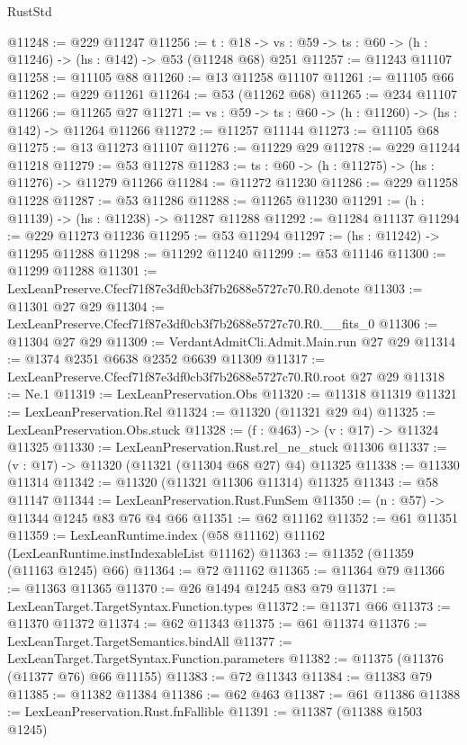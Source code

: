 \begin{lexlean}{RustStd}
\begin{coremodule}
@11248 := @229 @11247
@11256 := {t : @18} ->
  {vs : @59} -> {ts : @60} -> (h : @11246) -> (hs : @142) -> @53 (@11248 @68) @251
@11257 := @11243 @11107
@11258 := @11105 @88
@11260 := @13 @11258 @11107
@11261 := @11105 @66
@11262 := @229 @11261
@11264 := @53 (@11262 @68)
@11265 := @234 @11107
@11266 := @11265 @27
@11271 := {vs : @59} -> {ts : @60} -> (h : @11260) -> (hs : @142) -> @11264 @11266
@11272 := @11257 @11144
@11273 := @11105 @68
@11275 := @13 @11273 @11107
@11276 := @11229 @29
@11278 := @229 @11244 @11218
@11279 := @53 @11278
@11283 := {ts : @60} -> (h : @11275) -> (hs : @11276) -> @11279 @11266
@11284 := @11272 @11230
@11286 := @229 @11258 @11228
@11287 := @53 @11286
@11288 := @11265 @11230
@11291 := (h : @11139) -> (hs : @11238) -> @11287 @11288
@11292 := @11284 @11137
@11294 := @229 @11273 @11236
@11295 := @53 @11294
@11297 := (hs : @11242) -> @11295 @11288
@11298 := @11292 @11240
@11299 := @53 @11146
@11300 := @11299 @11288
@11301 := LexLeanPreserve.Cfecf71f87e3df0cb3f7b2688e5727c70.R0.denote
@11303 := @11301 @27 @29
@11304 := LexLeanPreserve.Cfecf71f87e3df0cb3f7b2688e5727c70.R0.__fits_0
@11306 := @11304 @27 @29
@11309 := VerdantAdmitCli.Admit.Main.run @27 @29
@11314 := @1374 @2351 @6638 @2352 @6639 @11309
@11317 := LexLeanPreserve.Cfecf71f87e3df0cb3f7b2688e5727c70.R0.root @27 @29
@11318 := Ne.{1}
@11319 := LexLeanPreservation.Obs
@11320 := @11318 @11319
@11321 := LexLeanPreservation.Rel
@11324 := @11320 (@11321 @29 @4)
@11325 := LexLeanPreservation.Obs.stuck
@11328 := (f : @463) -> (v : @17) -> @11324 @11325
@11330 := LexLeanPreservation.Rust.rel_ne_stuck @11306
@11337 := (v : @17) -> @11320 (@11321 (@11304 @68 @27) @4) @11325
@11338 := @11330 @11314
@11342 := @11320 (@11321 @11306 @11314) @11325
@11343 := @58 @11147
@11344 := LexLeanPreservation.Rust.FunSem
@11350 := (n : @57) -> @11344 @1245 @83 @76 @4 @66
@11351 := @62 @11162
@11352 := @61 @11351
@11359 := LexLeanRuntime.index (@58 @11162) @11162 (LexLeanRuntime.instIndexableList @11162)
@11363 := @11352 (@11359 (@11163 @1245) @66)
@11364 := @72 @11162
@11365 := @11364 @79
@11366 := @11363 @11365
@11370 := @26 @1494 @1245 @83 @79
@11371 := LexLeanTarget.TargetSyntax.Function.types
@11372 := @11371 @66
@11373 := @11370 @11372
@11374 := @62 @11343
@11375 := @61 @11374
@11376 := LexLeanTarget.TargetSemantics.bindAll
@11377 := LexLeanTarget.TargetSyntax.Function.parameters
@11382 := @11375 (@11376 (@11377 @76) @66 @11155)
@11383 := @72 @11343
@11384 := @11383 @79
@11385 := @11382 @11384
@11386 := @62 @463
@11387 := @61 @11386
@11388 := LexLeanPreservation.Rust.fnFallible
@11391 := @11387 (@11388 @1503 @1245)

\end{coremodule}
\end{lexlean}
